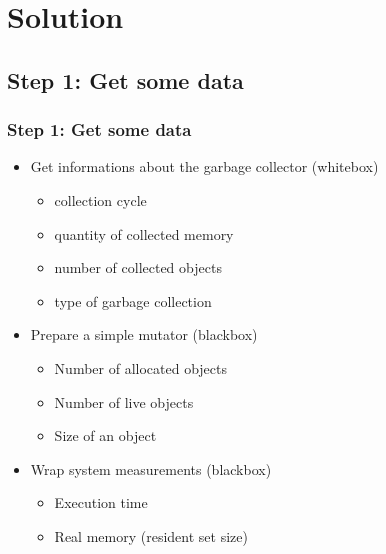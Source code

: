 \documentclass{beamer}
\begin{document}
	\section{Solution}
	\subsection{Step 1: Get some data}
	\begin{frame}
		\frametitle{Step 1: Get some data}
		\begin{itemize}
			\item Get informations about the garbage collector (whitebox)
			\begin{itemize}
				\item collection cycle
				\item quantity of collected memory
				\item number of collected objects
				\item type of garbage collection
			\end{itemize}
			
			\pause
			
			\item Prepare a simple mutator (blackbox)
			\begin{itemize}
				\item Number of allocated objects
				\item Number of live objects
				\item Size of an object
			\end{itemize}
			
			\pause
			
			\item Wrap system measurements (blackbox)
			\begin{itemize}
				\item Execution time
				\item Real memory (resident set size) 
			\end{itemize}
		\end{itemize}
	\end{frame}
	
\end{document}
